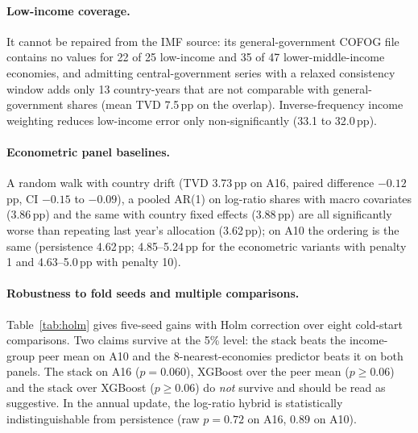 \paragraph{Low-income coverage.} It cannot be repaired from the IMF source: its general-government COFOG file contains no values for 22 of 25 low-income and 35 of 47 lower-middle-income economies, and admitting central-government series with a relaxed consistency window adds only 13 country-years that are not comparable with general-government shares (mean TVD 7.5\,pp on the overlap). Inverse-frequency income weighting reduces low-income error only non-significantly (33.1 to 32.0\,pp).
\paragraph{Econometric panel baselines.} A random walk with country drift (TVD 3.73\,pp on A16, paired difference $-0.12$\,pp, CI $-0.15$ to $-0.09$), a pooled AR(1) on log-ratio shares with macro covariates (3.86\,pp) and the same with country fixed effects (3.88\,pp) are all significantly worse than repeating last year's allocation (3.62\,pp); on A10 the ordering is the same (persistence 4.62\,pp; 4.85--5.24\,pp for the econometric variants with penalty 1 and 4.63--5.0\,pp with penalty 10).
\paragraph{Robustness to fold seeds and multiple comparisons.} Table~\ref{tab:holm} gives five-seed gains with Holm correction over eight cold-start comparisons. Two claims survive at the 5\% level: the stack beats the income-group peer mean on A10 and the 8-nearest-economies predictor beats it on both panels. The stack on A16 ($p=0.060$), XGBoost over the peer mean ($p\ge0.06$) and the stack over XGBoost ($p\ge0.06$) do \emph{not} survive and should be read as suggestive. In the annual update, the log-ratio hybrid is statistically indistinguishable from persistence (raw $p=0.72$ on A16, $0.89$ on A10).
